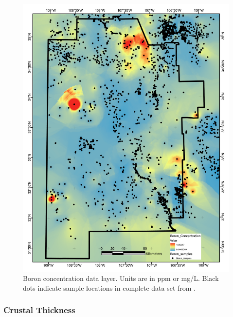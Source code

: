 \begin{figure}[!htp]
\centering
\includegraphics[scale=.50]{templates/images/Figure-Boron.pdf}
\caption[Boron concentration data layer]{Boron concentration data layer. Units are in ppm or mg/L. Black dots indicate sample locations in complete data set from \protect\citep{bielicki_hydrogeolgic_2015}.}
\label{fig:feat_boron}
\end{figure}

\subsubsection{Crustal Thickness}

